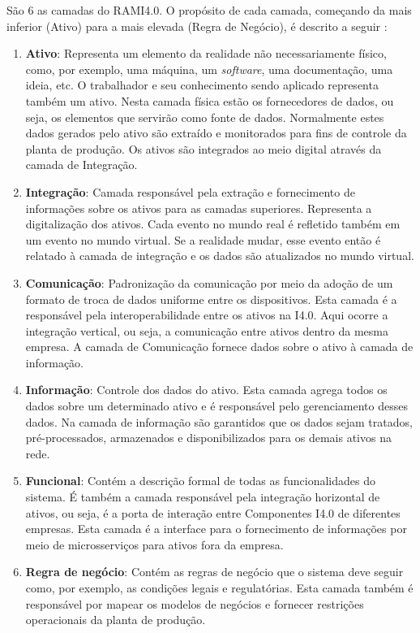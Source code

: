 	São 6 as camadas do RAMI4.0. O propósito de cada camada, começando da mais inferior (Ativo) para a mais elevada (Regra de Negócio), é descrito a seguir \cite{bitkom2016implementation}:
	
	\begin{enumerate}
		\item \textbf{Ativo}: Representa um elemento da realidade não necessariamente físico, como, por exemplo, uma máquina, um \textit{software}, uma documentação, uma ideia, etc. O trabalhador e seu conhecimento sendo aplicado representa também um ativo. Nesta camada física estão os fornecedores de dados, ou seja, os elementos que servirão como fonte de dados. Normalmente estes dados gerados pelo ativo são extraído e monitorados para fins de controle da planta de produção. Os ativos são integrados ao meio digital através da camada de Integração. 
		
		\item \textbf{Integração}: Camada responsável pela extração e fornecimento de informações sobre os ativos para as camadas superiores. Representa a digitalização dos ativos. Cada evento no mundo real é refletido também em um evento no mundo virtual. Se a realidade mudar, esse evento então é relatado à camada de integração e os dados são atualizados no mundo virtual.
		
		\item \textbf{Comunicação}: Padronização da comunicação por meio da adoção de um formato de troca de dados uniforme entre os dispositivos. Esta camada é a responsável pela interoperabilidade entre os ativos na I4.0. Aqui ocorre a integração vertical, ou seja, a comunicação entre ativos dentro da mesma empresa. A camada de Comunicação fornece dados sobre o ativo à camada de informação.
		
		\item \textbf{Informação}: Controle dos dados do ativo. Esta camada agrega todos os dados sobre um determinado ativo e é responsável pelo gerenciamento desses dados. Na camada de informação são garantidos que os dados sejam tratados, pré-processados, armazenados e disponibilizados para os demais ativos na rede.
		
		\item \textbf{Funcional}: Contém a descrição formal de todas as funcionalidades do sistema. É também a camada responsável pela integração horizontal de ativos, ou seja, é a porta de interação entre Componentes I4.0 de diferentes empresas. Esta camada é a interface para o fornecimento de informações por meio de microsserviços para ativos fora da empresa.
			
		\item \textbf{Regra de negócio}: Contém as regras de negócio que o sistema deve seguir como, por exemplo, as condições legais e regulatórias. Esta camada também é responsável por mapear os modelos de negócios e fornecer restrições operacionais da planta de produção.
	\end{enumerate}

